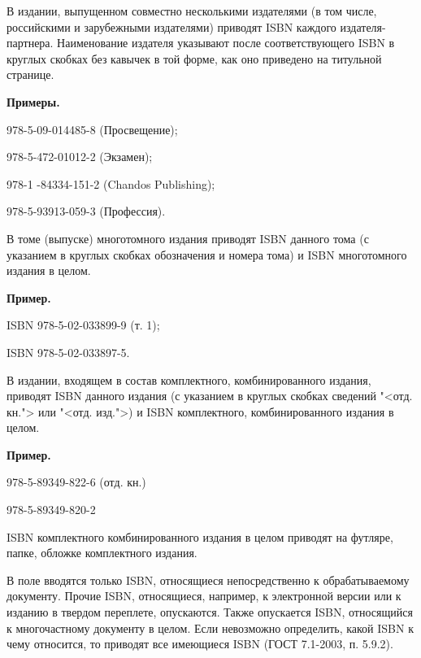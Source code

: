 В издании, выпущенном совместно несколькими издателями (в том числе, российскими и зарубежными издателями) приводят ISBN каждого издателя-партнера. Наименование издателя указывают после соответствующего ISBN в круглых скобках без кавычек в той форме, как оно приведено на титульной странице.

\textbf{Примеры.}

\begin{cutelist}
	\item 978-5-09-014485-8 (Просвещение);
	\item 978-5-472-01012-2 (Экзамен);
	\item 978-1 -84334-151-2 (Chandos Publishing);
	\item 978-5-93913-059-3 (Профессия).
\end{cutelist}

В томе (выпуске) многотомного издания приводят ISBN данного тома (с указанием в круглых скобках обозначения и номера тома) и ISBN многотомного издания в целом.

\textbf{Пример.}

\begin{cutelist}
	\item ISBN 978-5-02-033899-9 (т. 1);
	\item ISBN 978-5-02-033897-5.
\end{cutelist}

В издании, входящем в состав комплектного, комбинированного издания, приводят ISBN данного издания (с указанием в круглых скобках сведений "<отд. кн."> или "<отд. изд.">) и ISBN комплектного, комбинированного издания в целом.

\textbf{Пример.}

\begin{cutelist}
	\item 978-5-89349-822-6 (отд. кн.)
	\item 978-5-89349-820-2
\end{cutelist}

ISBN комплектного комбинированного издания в целом приводят на футляре, папке, обложке комплектного издания.

В поле вводятся только ISBN, относящиеся непосредственно к обрабатываемому документу. Прочие ISBN, относящиеся, например, к электронной версии или к изданию в твердом переплете, опускаются. Также опускается ISBN, относящийся к многочастному документу в целом.
Если невозможно определить, какой ISBN к чему относится, то приводят все имеющиеся ISBN (ГОСТ 7.1-2003, п. 5.9.2). %

